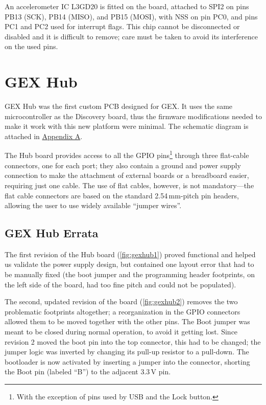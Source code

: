 An accelerometer \gls{IC} L3GD20 is fitted on the board, attached to SPI2 on pins PB13 (\gls{SCK}), PB14 (\gls{MISO}), and PB15 (\gls{MOSI}), with \gls{NSS} on pin PC0, and pins PC1 and PC2 used for interrupt flags. This chip cannot be disconnected or disabled and it is difficult to remove; care must be taken to avoid its interference on the used pins.

\section{GEX Hub}

GEX Hub was the first custom \gls{PCB} designed for GEX. It uses the same microcontroller as the Discovery board, thus the firmware modifications needed to make it work with this new platform were minimal. The schematic diagram is attached in \hyperref[apx:gex_hub]{Appendix A}.

The Hub board provides access to all the \gls{GPIO} pins\footnote{With the exception of pins used by USB and the Lock button.} through three flat-cable connectors, one for each port; they also contain a ground and power supply connection to make the attachment of external boards or a breadboard easier, requiring just one cable. The use of flat cables, however, is not mandatory---the flat cable connectors are based on the standard 2.54\,mm-pitch pin headers, allowing the user to use widely available ``jumper wires''.

\subsection{GEX Hub Errata}

The first revision of the Hub board (\cref{fig:gexhub1}) proved functional and helped us validate the power supply design, but contained one layout error that had to be manually fixed (the boot jumper and the programming header footprints, on the left side of the board, had too fine pitch and could not be populated).

The second, updated revision of the board (\cref{fig:gexhub2}) removes the two problematic footprints altogether; a reorganization in the \gls{GPIO} connectors allowed them to be moved together with the other pins. The Boot jumper was meant to be closed during normal operation, to avoid it getting lost. Since revision 2 moved the boot pin into the top connector, this had to be changed; the jumper logic was inverted by changing its pull-up resistor to a pull-down. The bootloader is now activated by inserting a jumper into the connector, shorting the Boot pin (labeled ``B'') to the adjacent 3.3\,V pin.

